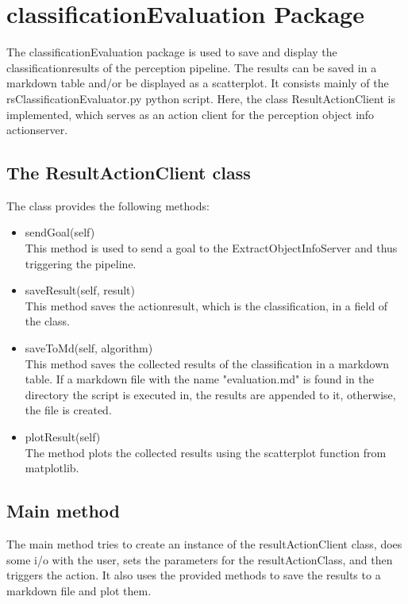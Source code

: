 \documentclass[main.tex]{subfiles}
\begin{document}
\section{classificationEvaluation Package}

The classificationEvaluation package is used to save and display the classificationresults of the perception pipeline. The results can be saved in a markdown table and/or be displayed as a scatterplot. It consists mainly of the rsClassificationEvaluator.py python script. Here, the class ResultActionClient is implemented, which serves as an action client for the perception object info actionserver.\\

\subsection{The ResultActionClient class}
The class provides the following methods:

\begin{itemize}
\item 
sendGoal(self)\\
This method is used to send a goal to the ExtractObjectInfoServer and thus triggering the pipeline.

\item saveResult(self, result)\\
This method saves the actionresult, which is the classification, in a field of the class.

\item saveToMd(self, algorithm)\\
This method saves the collected results of the classification in a markdown table. If a markdown file with the name "evaluation.md" is found in the directory the script is executed in, the results are appended to it, otherwise, the file is created.

\item plotResult(self)\\
The method plots the collected results using the scatterplot function from matplotlib.
\end{itemize}

\subsection{Main method}
The main method tries to create an instance of the resultActionClient class, does some i/o with the user, sets the parameters for the resultActionClass, and then triggers the action. It also uses the provided methods to save the results to a markdown file and plot them.
\end{document}

